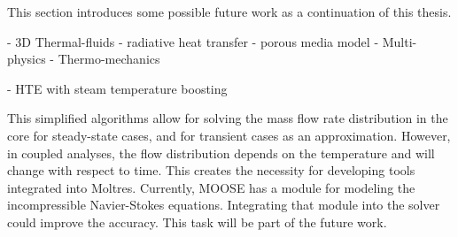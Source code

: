 This section introduces some possible future work as a continuation of this thesis.

- 3D Thermal-fluids
	- radiative heat transfer
	- porous media model
- Multi-physics
- Thermo-mechanics

- HTE with steam temperature boosting


This simplified algorithms allow for solving the mass flow rate distribution in the core for steady-state cases, and for transient cases as an approximation.
However, in coupled analyses, the flow distribution depends on the temperature and will change with respect to time.
This creates the necessity for developing tools integrated into Moltres.
Currently, MOOSE has a module for modeling the incompressible Navier-Stokes equations.
Integrating that module into the solver could improve the accuracy.
This task will be part of the future work.